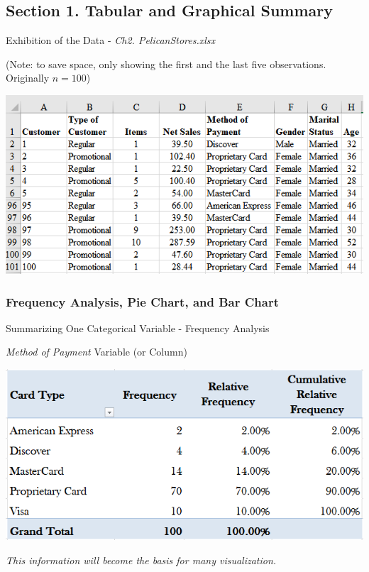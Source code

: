 \documentclass{beamer}
\begin{document}
\subsection{Section 1. Tabular and Graphical Summary}

\begin{frame}{Exhibition of the Data - \textit{Ch2. PelicanStores.xlsx}}

\begin{center}
(Note: to save space, only showing the first and the last five observations. Originally $n = 100$)
\vspace{0.5cm}

\includegraphics[scale=0.7]{images/ch2PelicanDataSnippet.png}
\end{center}


\end{frame}

\subsubsection{Frequency Analysis, Pie Chart, and Bar Chart}
\begin{frame}{Summarizing One Categorical Variable - Frequency Analysis}

\begin{center}
\textit{Method of Payment} Variable (or Column)
\vspace{0.5 cm}

\includegraphics[scale=0.6]{images/frequencyTable.png}

\vspace{0.5cm}
\textit{This information will become the basis for many visualization.
}
\end{center}

\end{frame}
\end{document}
